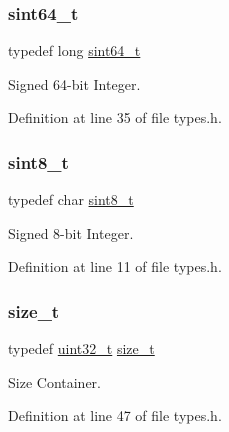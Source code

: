 \subsubsection{\texorpdfstring{sint64\+\_\+t}{sint64\_t}}
{\footnotesize\ttfamily typedef long \hyperlink{a00032_a04761b9e7480e1e48b0d392da17fd5d4_a04761b9e7480e1e48b0d392da17fd5d4}{sint64\+\_\+t}}



Signed 64-\/bit Integer. 



Definition at line 35 of file types.\+h.

\mbox{\label{a00032_afa23178c4119f09bd4562a86b501f444_afa23178c4119f09bd4562a86b501f444}} 
\subsubsection{\texorpdfstring{sint8\+\_\+t}{sint8\_t}}
{\footnotesize\ttfamily typedef char \hyperlink{a00032_afa23178c4119f09bd4562a86b501f444_afa23178c4119f09bd4562a86b501f444}{sint8\+\_\+t}}



Signed 8-\/bit Integer. 



Definition at line 11 of file types.\+h.

\mbox{\label{a00032_a29d85914ddff32967d85ada69854206d_a29d85914ddff32967d85ada69854206d}} 
\subsubsection{\texorpdfstring{size\+\_\+t}{size\_t}}
{\footnotesize\ttfamily typedef \hyperlink{a00032_a435d1572bf3f880d55459d9805097f62_a435d1572bf3f880d55459d9805097f62}{uint32\+\_\+t} \hyperlink{a00032_a29d85914ddff32967d85ada69854206d_a29d85914ddff32967d85ada69854206d}{size\+\_\+t}}



Size Container. 



Definition at line 47 of file types.\+h.

\mbox{\label{a00032_a273cf69d639a59973b6019625df33e30_a273cf69d639a59973b6019625df33e30}} 
